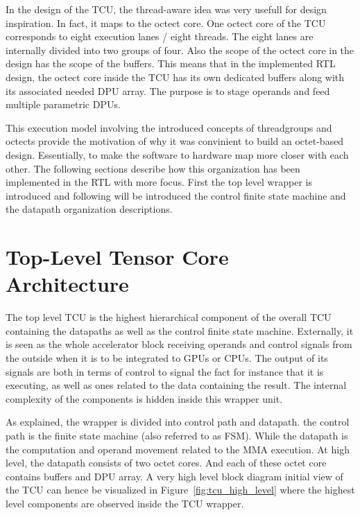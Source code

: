 
In the design of the TCU, the thread-aware idea was very usefull for design inspiration. In fact, it maps to the octect core. One octect core of the TCU corresponds to eight execution lanes / eight threads. The eight lanes are internally divided into two groups of four. Also the scope of the octect core in the design has the scope of the buffers. This means that in the implemented RTL design, the octect core inside the TCU has its own dedicated buffers along with its associated needed DPU array. The purpose is to stage operands and feed multiple parametric DPUs.


This execution model involving the introduced concepts of threadgroups and octects provide the motivation of why it was convinient to build an octet-based design. Essentially, to make the software to hardware map more closer with each other. The following sections describe how this organization has been implemented in the RTL with more focus. First the top level wrapper is introduced and following will be introduced the control finite state machine and the datapath organization descriptions. 

\section{Top-Level Tensor Core Architecture}

The top level TCU is the highest hierarchical component of the overall TCU containing the datapaths as well as the control finite state machine. Externally, it is seen as the whole accelerator block receiving operands and control signals from the outside when it is to be integrated to GPUs or CPUs. The output of its signals are both in terms of control to signal the fact for instance that it is executing, as well as ones related to the data containing the result. The internal complexity of the components is hidden inside this wrapper unit. 

As explained, the wrapper is divided into control path and datapath. the control path is the finite state machine (also referred to as FSM). While the datapath is the computation and operand movement related to the MMA execution. At high level, the datapath consists of two octet cores. And each of these octet core contains buffers and DPU array.  A very high level block diagram initial view of the TCU can hence be visualized in Figure~\ref{fig:tcu_high_level} where the highest level components are observed inside the TCU wrapper.

